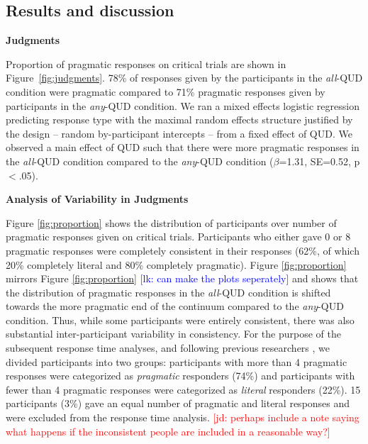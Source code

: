 \documentclass[10pt,letterpaper]{article}
\newcommand{\jd}[1]{\textcolor{Red}{[jd: #1]}}
\newcommand{\lk}[1]{\textcolor{Blue}{[lk: #1]}}
\newcommand{\figref}[1]{Figure \ref{#1}}
\begin{document}
 
\subsection{Results and discussion}



\noindent \textbf{Judgments}

Proportion of pragmatic responses on critical trials are shown in Figure~\ref{fig:judgments}. 78\% of responses given by the participants in the \textit{all}-QUD condition were pragmatic compared to 71\% pragmatic responses given by participants in the \textit{any}-QUD condition. We ran a mixed effects logistic regression predicting response type with the maximal random effects structure justified by the design --  random by-participant intercepts -- from a fixed effect of QUD.  We observed a main effect of QUD such that there were more pragmatic responses in the \textit{all}-QUD condition compared to the \textit{any}-QUD condition ($\beta$=1.31, SE=0.52, p$<$.05).

\noindent \textbf{Analysis of Variability in Judgments} 

\figref{fig:proportion} shows the distribution of participants over number of pragmatic responses given on critical trials. Participants who either gave 0 or 8 pragmatic responses were completely consistent in their responses (62\%, of which 20\% completely literal and 80\% completely pragmatic). \figref{fig:proportion} mirrors \figref{fig:proportion} \lk{can make the plots seperately} and shows that the distribution of pragmatic responses in the \emph{all}-QUD condition is shifted towards the more pragmatic end of the continuum compared to the \emph{any}-QUD condition. Thus, while some participants were entirely consistent, there was also substantial inter-participant variability in consistency. For the purpose of the subsequent response time analyses, and following previous researchers \cite{BottNoveck2004,Degen2015}, we divided participants into two groups:  participants with more than 4 pragmatic responses were categorized as \emph{pragmatic} responders (74\%) and participants with fewer than 4 pragmatic responses were categorized as \emph{literal} responders (22\%). 15 participants (3\%) gave an equal number of pragmatic and literal responses and were excluded from the response time analysis. \jd{perhaps include a note saying what happens if the inconsistent people are included in a reasonable way?}
\end{document}
